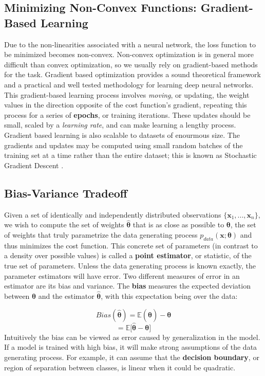 \subsection{Minimizing Non-Convex Functions: Gradient-Based Learning}
Due to the non-linearities associated with a neural network, the loss function to be minimized becomes non-convex.
Non-convex optimization is in general more difficult than convex optimization, so we usually rely on gradient-based methods for the task.
Gradient based optimization provides a sound theoretical framework and a practical and well tested methodology for learning
deep neural networks. This gradient-based learning process involves \textit{moving},
or updating, the weight values in the direction opposite of the cost function's gradient, repeating this process for a series of
\textbf{epochs}, or training iterations.
These updates should be small, scaled by a
\textit{learning rate}, and can make learning a lengthy process. Gradient based learning is also scalable to datasets of enourmous size.
The gradients and updates may be computed using small random batches of the training set at a time rather than the entire dataset; this is known as Stochastic Gradient Descent \cite{bottou2010large}.

\subsection{Bias-Variance Tradeoff}

Given a set of identically and independently distributed observations $\{\bm{x}_1, ... , \bm{x}_n\}$, we wish to compute the set of
weights $\bm{\hat{\theta}}$ that is as close as possible to $\bm{\theta}$, the set of weights that truly parametrize the data generating
process $p_{data}(\bm{x};\bm{\theta})$ and thus minimizes the cost function. This concrete set of parameters (in contrast to a density over
possible values) is called a \textbf{point estimator}, or statistic, of the true set of parameters.
Unless the data generating process is known exactly, the parameter estimators will have error.
Two different measures of error in an estimator are its bias and variance.
The \textbf{bias} measures the expected deviation between $\bm{\theta}$ and the estimator $\bm{\hat{\theta}}$,
with this expectation being over the data:

\[Bias(\bm{\hat{\theta}}) = \mathbb{E}{(\bm{\hat{\theta}})} - \bm{\theta}\]
\[ = \mathbb{E}{[\bm{\hat{\theta}} - \bm{\theta}}]\]
Intuitively the bias can be viewed as error caused by generalization in the model. If a model is trained with high bias, it will make strong assumptions
of the data generating process. For example, it can assume that the \textbf{decision boundary}, or region of separation between classes, is linear when it could be quadratic.

